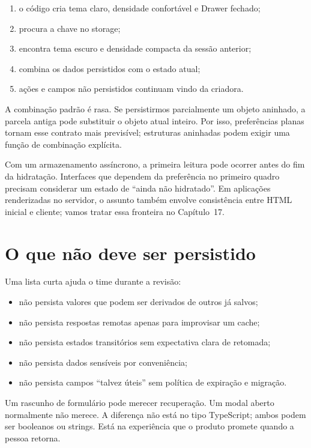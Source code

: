 \begin{enumerate}
  \item o código cria tema claro, densidade confortável e Drawer fechado;
  \item {} procura a chave no storage;
  \item encontra tema escuro e densidade compacta da sessão anterior;
  \item combina os dados persistidos com o estado atual;
  \item ações e campos não persistidos continuam vindo da criadora.
\end{enumerate}

A combinação padrão é rasa. Se persistirmos parcialmente um objeto aninhado, a
parcela antiga pode substituir o objeto atual inteiro. Por isso, preferências
planas tornam esse contrato mais previsível; estruturas aninhadas podem exigir
uma função de combinação explícita.

Com um armazenamento assíncrono, a primeira leitura pode ocorrer antes do fim da
hidratação. Interfaces que dependem da preferência no primeiro quadro precisam
considerar um estado de ``ainda não hidratado''. Em aplicações renderizadas no
servidor, o assunto também envolve consistência entre HTML inicial e cliente;
vamos tratar essa fronteira no Capítulo~17.

\section{O que não deve ser persistido}

Uma lista curta ajuda o time durante a revisão:

\begin{itemize}
  \item não persista valores que podem ser derivados de outros já salvos;
  \item não persista respostas remotas apenas para improvisar um cache;
  \item não persista estados transitórios sem expectativa clara de retomada;
  \item não persista dados sensíveis por conveniência;
  \item não persista campos ``talvez úteis'' sem política de expiração e migração.
\end{itemize}

Um rascunho de formulário pode merecer recuperação. Um modal aberto normalmente
não merece. A diferença não está no tipo TypeScript; ambos podem ser booleanos
ou strings. Está na experiência que o produto promete quando a pessoa retorna.

